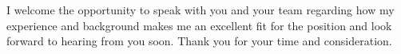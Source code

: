\documentclass[11pt, letterpaper]{awesome-cv}
\begin{document}
\begin{cvletter}
I welcome the opportunity to speak with you and your team regarding how my experience and background makes me an excellent fit for the position and look forward to hearing from you soon. Thank you for your time and consideration.

\end{cvletter}


\makeletterclosing
\end{document}

